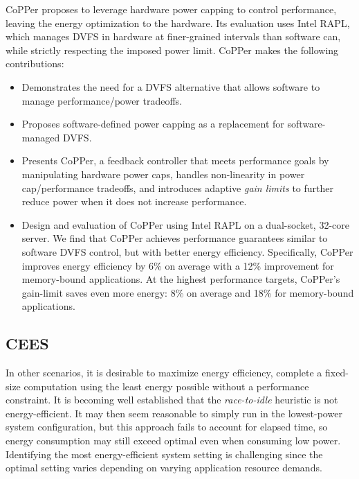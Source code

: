 CoPPer proposes to leverage hardware power capping to control performance, leaving the energy optimization to the hardware.
Its evaluation uses Intel RAPL, which manages DVFS in hardware at finer-grained intervals than software can, while strictly respecting the imposed power limit.
CoPPer makes the following contributions:
\begin{itemize}
\item Demonstrates the need for a DVFS alternative that allows software to manage performance/power tradeoffs.
\item Proposes software-defined power capping as a replacement for software-managed DVFS.
\item Presents CoPPer, a feedback controller that meets performance goals by manipulating hardware power caps, handles non-linearity in power cap/performance tradeoffs, and introduces adaptive \emph{gain limits} to further reduce power when it does not increase performance.
\item Design and evaluation of CoPPer using Intel RAPL on a dual-socket, 32-core server.
We find that CoPPer achieves performance guarantees similar to software DVFS control, but with better energy efficiency.
Specifically, CoPPer improves energy efficiency by 6\% on average with a 12\% improvement for memory-bound applications.
At the highest performance targets, CoPPer's gain-limit saves even more energy: 8\% on average and 18\% for memory-bound applications.
\end{itemize}


\subsection{CEES}
\label{sec:intro-ee}

In other scenarios, it is desirable to maximize energy efficiency, \ie complete a fixed-size computation using the least energy possible without a performance constraint.
It is becoming well established that the \emph{race-to-idle} heuristic is not energy-efficient.
It may then seem reasonable to simply run in the lowest-power system configuration, but this approach fails to account for elapsed time, so energy consumption may still exceed optimal even when consuming low power.
Identifying the most energy-efficient system setting is challenging since the optimal setting varies depending on varying application resource demands.

